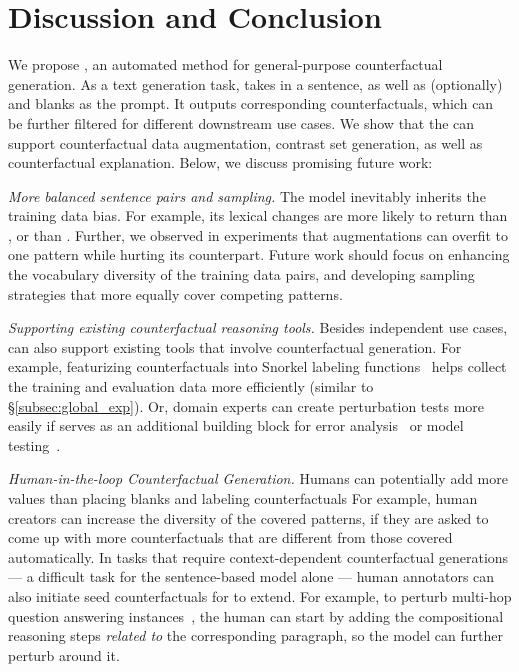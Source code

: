 \section{Discussion and Conclusion}
\label{sec:discuss}

We propose \sysname, an automated method for general-purpose counterfactual generation. 
As a text generation task, \sysname takes in a sentence, as well as (optionally) \tagstrs and blanks as the prompt.
It outputs corresponding counterfactuals, which can be further filtered for different downstream use cases. 
We show that the \sysname can support counterfactual data augmentation, contrast set generation, as well as counterfactual explanation.
Below, we discuss promising future work:

\emph{More balanced sentence pairs and sampling.}
The \sysname model inevitably inherits the training data bias.
For example, its lexical changes are more likely to return  than , or  than .
Further, we observed in \qqp experiments that augmentations can overfit to one pattern while hurting its counterpart. 
Future work should focus on enhancing the vocabulary diversity of the training data pairs, and developing sampling strategies that more equally cover competing patterns.

\emph{Supporting existing counterfactual reasoning tools.}
Besides independent use cases, \sysname can also support existing tools that involve counterfactual generation.
For example, featurizing counterfactuals into Snorkel labeling functions~\cite{ratner2017snorkel} helps collect the training and evaluation data more efficiently (similar to \S\ref{subsec:global_exp}).
Or, domain experts can create perturbation tests more easily if \sysname serves as an additional building block for error analysis~\cite{wu2019errudite} or model testing~\cite{checklist:acl20}.


\emph{Human-in-the-loop Counterfactual Generation.}
Humans can potentially add more values than placing blanks and labeling counterfactuals
For example, human creators can increase the diversity of the covered patterns, if they are asked to come up with more counterfactuals that are different from those covered automatically.
In tasks that require context-dependent counterfactual generations --- a difficult task for the sentence-based model alone --- human annotators can also initiate seed counterfactuals for \sysname to extend.
For example, to perturb multi-hop question answering instances~\cite{gardner2020contrast}, the human can start by adding the compositional reasoning steps \emph{related to} the corresponding paragraph, so the model can further perturb around it.